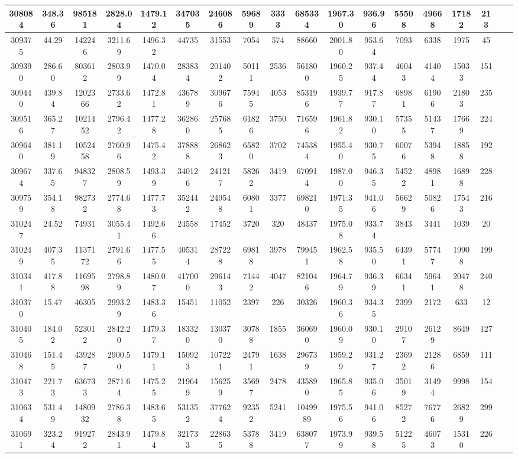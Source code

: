 \documentclass[10pt]{extarticle}
\begin{document}
\begin{longtable}{|c|c|c|c|c|c|c|c|c|c|c|c|c|c|c|c|c|c|}
\hline 
308084&348.36&985181&2828.04&1479.12&347035&246086&59689&3333&685334&1967.30&936.96&55508&49668&17182&213 \\ 
\hline 
309375&44.29&142246&3211.69&1496.32&44735&31553&7054&574&88660&2001.80&953.64&7093&6338&1975&45 \\ 
\hline 
309390&286.60&803612&2803.99&1470.04&283834&201402&50111&2536&561800&1960.25&937.44&46043&41404&15033&151 \\ 
\hline 
309440&439.84&1202366&2733.62&1472.81&436789&309676&75945&4053&853196&1939.77&917.87&68981&61906&21803&235 \\ 
\hline 
309516&365.27&1021452&2796.42&1477.28&362860&257685&61826&3750&716596&1961.82&930.10&57355&51437&17669&224 \\ 
\hline 
309640&381.19&1052458&2760.96&1475.42&378888&268623&65820&3702&745384&1955.40&930.75&60076&53948&18858&192 \\ 
\hline 
309674&337.65&948327&2808.59&1493.39&340126&241217&58262&3419&670914&1987.00&946.35&54522&48981&16898&228 \\ 
\hline 
309759&354.18&982732&2774.68&1477.73&352442&249548&60801&3377&698210&1971.35&941.06&56629&50826&17543&216 \\ 
\hline 
310247&24.52&74931&3055.41&1492.66&24558&17452&3720&320&48437&1975.08&933.74&3843&3441&1039&20 \\ 
\hline 
310249&407.35&1137172&2791.66&1477.55&405314&287228&69818&3978&799451&1962.58&935.50&64391&57747&19908&199 \\ 
\hline 
310341&417.88&1169598&2798.89&1480.07&417000&296143&71442&4047&821046&1964.79&936.39&66341&59641&20478&240 \\ 
\hline 
310370&15.47&46305&2993.29&1483.36&15451&11052&2397&226&30326&1960.36&934.35&2399&2172&633&12 \\ 
\hline 
310405&184.02&523012&2842.20&1479.37&183320&130370&30788&1855&360690&1960.09&930.10&29107&26129&8649&127 \\ 
\hline 
310468&151.45&439287&2900.50&1479.11&150923&107221&24791&1638&296739&1959.29&931.27&23692&21286&6859&111 \\ 
\hline 
310473&221.73&636733&2871.64&1475.25&219649&156259&35697&2478&435890&1965.85&935.06&35019&31494&9998&154 \\ 
\hline 
310634&531.49&1480932&2786.38&1483.65&531352&377624&92352&5241&1049989&1975.56&941.06&85272&76776&26829&299 \\ 
\hline 
310691&323.24&919272&2843.91&1479.84&321733&228635&53788&3419&638077&1973.99&939.58&51225&46073&15310&226 \\ 

\end{longtable}
\end{document}
